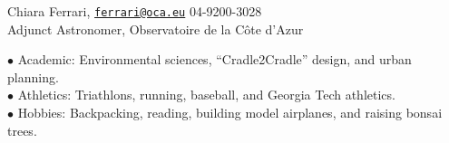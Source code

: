 \documentclass[12pt]{cv}
\begin{document}
\begin{llist}
Chiara Ferrari, \href{mailto:ferrari@oca.eu}{\tt ferrari@oca.eu} \hfill 04-9200-3028\\
Adjunct Astronomer, Observatoire de la C\^ote d'Azur


$\bullet$ Academic: Environmental sciences, ``Cradle2Cradle'' design, and urban planning.\\
$\bullet$ Athletics: Triathlons, running, baseball, and Georgia Tech athletics.\\
$\bullet$ Hobbies: Backpacking, reading, building model airplanes, and raising bonsai trees.

\end{llist}
\end{document}

